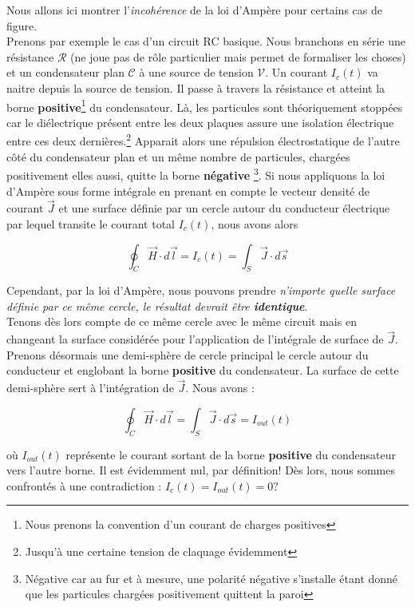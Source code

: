 \documentclass[a4paper,12pt]{article}
\begin{document}
Nous allons ici montrer l'\textit{incohérence} de la loi d'Ampère pour certains cas de figure. \\
Prenons par exemple  le cas d'un circuit RC basique. Nous branchons en série une résistance $\mathcal{R}$ (ne joue pas de rôle particulier mais permet de formaliser les choses) et un condensateur plan $\mathcal{C}$ à une source de tension $\mathcal{V}$. Un courant $I_{c}(t)$ va naitre depuis la source de tension. Il passe à travers la résistance et atteint la borne \textbf{positive}\footnote{Nous prenons la convention d'un courant de charges positives} du condensateur. Là, les particules sont théoriquement stoppées car le diélectrique présent entre les deux plaques assure une isolation électrique entre ces deux dernières.\footnote{Jusqu'à une certaine tension de claquage évidemment} Apparait alors une répulsion électrostatique de l'autre côté du condensateur plan  et un même nombre de particules, chargées positivement elles aussi, quitte la borne \textbf{négative} \footnote{Négative car au fur et à mesure, une polarité négative s'installe étant donné que les particules chargées positivement quittent la paroi}. Si nous appliquons la loi d'Ampère sous forme intégrale en prenant en compte le vecteur densité de courant $\vec{J}$ et une surface définie par un cercle autour du conducteur électrique par lequel transite le courant total $I_{c}(t)$, nous avons alors 

\[  \oint_{C} \vec{H} \cdot d\vec{l} = I_{c}(t) = \int_{S} \vec{J} \cdot d\vec{s} \]

\newpage

Cependant, par la loi d'Ampère, nous pouvons prendre \textit{n'importe quelle surface définie par ce même cercle, le résultat devrait être \textbf{identique}}. \\
Tenons dès lors compte de ce même cercle avec le même circuit mais en changeant la surface considérée pour l'application de l'intégrale de surface de $\vec{J}$. 
Prenons désormais une demi-sphère de cercle principal le cercle autour du conducteur et englobant la borne \textbf{positive} du condensateur. La surface de cette demi-sphère sert
à l'intégration de $\vec{J}$. Nous avons : 

\[  \oint_{C} \vec{H} \cdot d\vec{l} =  \int_{S} \vec{J} \cdot d\vec{s} = I_{out}(t)\] 

où $I_{out}(t)$ représente le courant sortant de la borne \textbf{positive} du condensateur vers l'autre borne. 
Il est évidemment nul, par définition! Dès lors, nous sommes confrontés à une contradiction : $I_{c}(t) = I_{out}(t) = 0?$ 
\\ 
\end{document}

